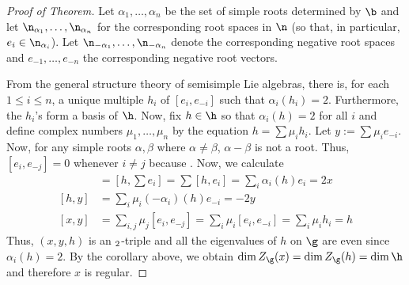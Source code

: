 \documentclass[springer-theory-notes.tex]{subfiles}
\begin{document}
\begin{proof}[Proof of Theorem]
  Let \(\alpha_1, \ldots, \alpha_n\) be the set of simple roots
  determined by \(\b\) and let \(\n_{\alpha_1}, \ldots,
  \n_{\alpha_n}\) for the corresponding root spaces in \(\n\) (so
  that, in  particular, \(e_i \in \n_{\alpha_i}\)). Let
  \(\n_{-\alpha_1}, \ldots, \n_{-\alpha_n}\) denote the corresponding negative root
  spaces and \(e_{-1}, \ldots, e_{-n}\) the corresponding negative
  root vectors.

  From the general structure theory of semisimple Lie algebras, there
  is, for each \(1 \leq i \leq n\), a unique multiple \(h_i\) of
  \([e_i, e_{-i}]\) such that \(\alpha_i(h_i) = 2\). Furthermore, the
  \(h_i\)'s form a basis of \(\h\). Now, fix \(h \in \h\) so that
  \(\alpha_i(h) = 2\) for all \(i\) and define complex numbers
  \(\mu_1, \ldots, \mu_n\) by the equation \(h = \sum \mu_i h_i\). Let
  \(y := \sum \mu_i e_{-i}\). Now, for any simple roots \(\alpha,
  \beta\) where \(\alpha \neq \beta\), \(\alpha - \beta\) is not a
  root. Thus, \([e_i, e_{-j}] = 0\) whenever \(i \neq j\) because
  . Now, we calculate 
  \begin{align*}
    [h,x] & = [h,\sum e_i] = \sum [h,e_i] = \sum_i \alpha_i(h) e_i = 2x \\
    [h,y] & = \sum_i \mu_i(-\alpha_i)(h)e_{-i} = -2y \\
    [x,y] & = \sum_{i,j} \mu_j [e_i, e_{-j}] = \sum_i \mu_i [e_i,
            e_{-i}] = \sum_i \mu_i h_i = h
  \end{align*}
  Thus, \((x,y,h)\) is an \(\sl_2\)-triple and all the eigenvalues of
  \(h\) on \(\g\) are even since \(\alpha_i(h) = 2\). By the corollary
  above, we obtain \(\dim Z_\g(x) = \dim Z_\g(h) = \dim \h\) and
  therefore \(x\) is regular.
\end{proof}
\end{document}
